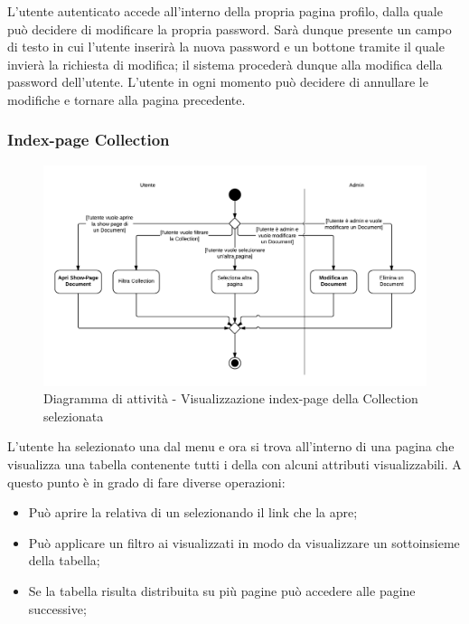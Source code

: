 L'utente autenticato accede all'interno della propria pagina profilo, dalla quale può decidere di modificare la propria password. Sarà dunque presente un campo di testo in cui l'utente inserirà la nuova password e un bottone tramite il quale invierà la richiesta di modifica; il sistema  procederà dunque alla modifica della password dell'utente. L'utente in ogni momento può decidere di annullare le modifiche e tornare alla pagina precedente.

\subsubsection{Index-page Collection}

\begin{figure}[H]
\centering
\includegraphics[scale=0.2]{uml/MaaP - Index-page.png}
\caption{Diagramma di attività - Visualizzazione index-page della Collection selezionata}
\end{figure}

L'utente ha selezionato una  dal menu e ora si trova all'interno di una pagina che visualizza una tabella contenente tutti i  della  con alcuni attributi visualizzabili. A questo punto è in grado di fare diverse operazioni:

\begin{itemize}

	\item Può aprire la relativa  di un  selezionando il link che la apre;
	\item Può applicare un filtro ai  visualizzati in modo da visualizzare un sottoinsieme della tabella;
	\item Se la tabella risulta distribuita su più pagine può accedere alle pagine successive;

\end{itemize}

